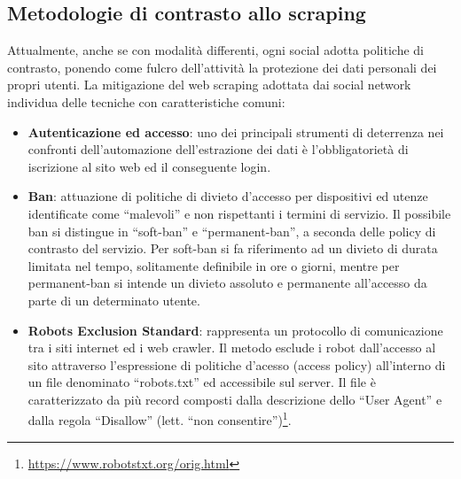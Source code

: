 \subsection{Metodologie di contrasto allo scraping} \label{metodi_contrasto}
Attualmente, anche se con modalit\`a differenti, ogni social adotta politiche di contrasto, ponendo come fulcro dell'attivit\`a la protezione dei dati personali dei propri utenti.
La mitigazione del web scraping adottata dai social network individua delle tecniche con caratteristiche comuni:
\begin{itemize}
    \item \textbf{Autenticazione ed accesso}: uno dei principali strumenti di deterrenza nei confronti dell'automazione dell'estrazione dei dati \`e l'obbligatoriet\`a di iscrizione al sito web ed il conseguente login.
    \item \textbf{Ban}: attuazione di politiche di divieto d'accesso per dispositivi ed utenze identificate come ``malevoli'' e non rispettanti i termini di servizio. Il possibile ban si distingue in ``soft-ban'' e ``permanent-ban'', a seconda delle policy di contrasto del servizio. Per soft-ban si fa riferimento ad un divieto di durata limitata nel tempo, solitamente definibile in ore o giorni, mentre per permanent-ban si intende un divieto assoluto e permanente all'accesso da parte di un determinato utente.
    \item \textbf{Robots Exclusion Standard}: rappresenta un protocollo di comunicazione tra i siti internet ed i web crawler. Il metodo esclude i robot dall'accesso al sito attraverso l'espressione di politiche d'acesso (access policy) all'interno di un file denominato ``robots.txt'' ed accessibile sul server. Il file \`e caratterizzato da pi\`u record composti dalla descrizione dello ``User Agent'' e dalla regola ``Disallow'' (lett. ``non consentire'')\footnote{\url{https://www.robotstxt.org/orig.html}}.
    

\end{itemize}
